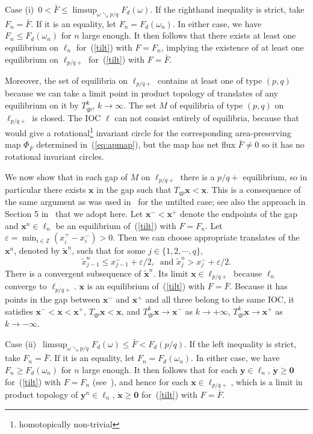 \documentclass[12pt]{article}
\newcommand{\Z}{\mathbb{Z}}
\newcommand{\eps}{\varepsilon}
\newcommand{\refer}[1]{~(\ref{#1})}
\newcommand{\xbf}{{\mathbf{x}}}
\newcommand{\ybf}{{\mathbf{y}}}
\newcommand{\zero}{{\mathbf{0}}}
\newcommand{\RSM}{\textcolor{red}}
\begin{document}
\vspace{2mm}

Case (i)\ $0< \bar{F}\leq \limsup_{\omega\searrow p/q}F_d(\omega)$. If the righthand inequality is strict, take $F_n=\bar{F}$. If it is an equality, let $F_n=F_d(\omega_n)$. In either case, we have $F_n\leq F_d(\omega_n)$ for $n$ large enough. It then follows that
 there exists at least one equilibrium on $\ell_n$ for\refer{tilt} with
$F=F_n$, implying the existence of at least one equilibrium on $\ell_{p/q+}$ for\refer{tilt} with $F=\bar{F}$.

Moreover, the set of equilibria on $\ell_{p/q+}$ contains at least one of type $(p,q)$ because we can take a limit point in product topology of translates of any equilibrium on it by $T_{qp}^k$,
$k\to\infty$. The set $M$ of equilibria of type $(p,q)$ on $\ell_{p/q+}$ is closed. The IOC $\ell$ can not consist entirely of equilibria,
because that would give a rotational\footnote{homotopically non-trivial} invariant circle for the corresponding area-preserving map $\Phi_{\bar{F}}$ determined in\refer{eq:apmap},
but the map has net flux $\bar{F} \ne 0$ so it has no rotational invariant circles.

We now show that in each gap of $M$ on $\ell_{p/q+}$ there is a $p/q+$ equilibrium, so in particular there exists $\xbf$ in the gap such that $T_{qp}\xbf<\xbf$.
This is a consequence of the same argument as was used in~\cite{ALD} for the untilted case; see also the approach in Section 5 in~\cite{Ban} that we adopt here. Let
$\xbf^-<\xbf^+$ denote the endpoints of the gap and
$\xbf^n\in\ell_n$ be an equilibrium of\refer{tilt} with $F=F_n$. Let $\eps=\min_{i\in\Z}(x^+_i-x^-_i)>0$. Then we can choose appropriate translates of the $\xbf^n$, denoted by $\tilde{\xbf}^n$, such that for some $j\in\{1,2,\cdots,q\}$,
$$
\tilde{x}_{j-1}^n\leq x_{j-1}^-+\eps/2, \ \mbox{ and }
\tilde{x}_j^n>x_j^-+\eps/2.
$$
There is a convergent subsequence of $\tilde{\xbf}^n$.  Its limit $\xbf\in \ell_{p/q+}$ because $\ell_n$ converge to $\ell_{p/q+}$.  $\xbf$ is an equilibrium of\refer{tilt} with $F=\bar{F}$.  Because it has points in the gap between $\xbf^-$ and $\xbf^+$ and all three belong to the same IOC, it satisfies $\xbf^-<\xbf<\xbf^+$, $T_{qp}\xbf<\xbf$, and $T_{qp}^k\xbf\to \xbf^-$ as $k\to +\infty$, $T_{qp}^k\xbf\to \xbf^+$ as $k\to -\infty$. %

\vspace{2mm}

Case (ii)\ $\limsup_{\omega\searrow p/q}F_d(\omega)\leq \bar{F}<F_d(p/q)$.  If the left inequality is strict, take $F_n=\bar{F}$. If it is an equality, let $F_n=F_d(\omega_n)$. In either case, we have $F_n\geq F_d(\omega_n)$ for $n$ large enough. It then follows that for each $\ybf\in\ell_n$, $\dot{\ybf}\geq\zero$ for\refer{tilt} with $F=F_n$ (see~\cite{QW1}), and hence for each $\xbf\in\ell_{p/q+}$, which is a limit in product topology of $\ybf^n\in\ell_n$, $\dot{\xbf}\geq\zero$ for\refer{tilt} with $F=\bar{F}$.
\end{document}
